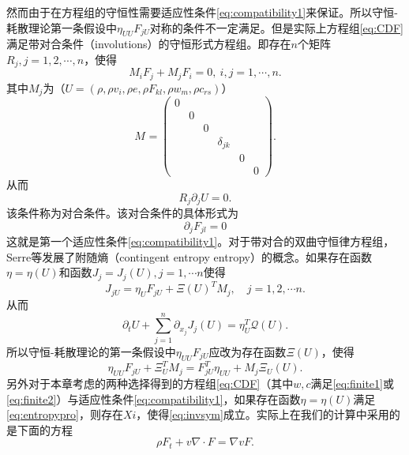\documentclass{article}
\begin{document}
然而由于在方程组的守恒性需要适应性条件\eqref{eq:compatibility1}来保证。所以守恒-耗散理论第一条假设中$\eta_{UU} F_{jU}$对称的条件不一定满足。但是实际上方程组\eqref{eq:CDF}满足带对合条件（involutions）的守恒形式方程组\cite{}。即存在$n$个矩阵$R_j,j=1,2,\cdots,n$，使得
\begin{equation*}
	M_i F_{j} + M_j F_i = 0, \ i,j = 1, \cdots,n .
\end{equation*}
其中$M_j$为（$U= (\rho,\rho v_i,\rho e, \rho F_{kl},\rho w_m, \rho c_{rs})$）
\begin{equation*}
	M_{} = \left( \begin{array}{ccccccc}
		0 \\
		& 0 \\
		& & 0 \\
		& & & \delta_{jk} \\
		& & & & 0 \\
		& & & & & 0
	\end{array} \right).
\end{equation*}
从而
\begin{equation}\label{eq:involutions}
	R_j \partial_j U = 0.
\end{equation}
该条件称为对合条件。该对合条件的具体形式为
\begin{equation*}
	\partial_{j} F_{jl} = 0
\end{equation*}
这就是第一个适应性条件\eqref{eq:compatibility1}。对于带对合的双曲守恒律方程组，Serre等发展了附随熵（contingent entropy entropy）的概念。如果存在函数$\eta = \eta(U)$和函数$J_j=J_j(U),j=1, \cdots n$使得
\begin{equation*}
	J_{jU}  = \eta_U F_{jU} + \Xi(U)^T M_j,\quad j=1,2, \cdots n.
\end{equation*}
从而
\begin{equation*}
	\partial_t U + \sum_{j=1}^n \partial_{x_j} J_{j}(U) = \eta_U^T \mathcal{Q}(U).
\end{equation*}
所以守恒-耗散理论的第一条假设中$\eta_{UU} F_{jU}$应改为存在函数$\Xi(U)$，使得
\begin{equation}\label{eq:invsym}
	\eta_{UU} F_{jU} + \Xi_U^T M_j = F_{jU}^T \eta_{UU} + M_j \Xi_U(U).
\end{equation}
另外对于本章考虑的两种选择得到的方程组\eqref{eq:CDF}（其中$w,c$满足\eqref{eq:finite1}或\eqref{eq:finite2}）与适应性条件\eqref{eq:compatibility1}，如果存在函数$\eta = \eta(U)$满足\eqref{eq:entropypro}，则存在$Xi$，使得\eqref{eq:invsym}成立。实际上在我们的计算中采用的是下面的方程
\begin{equation*}
	\rho F_t + v \nabla \cdot F = \nabla v F.
\end{equation*}
\end{document}
